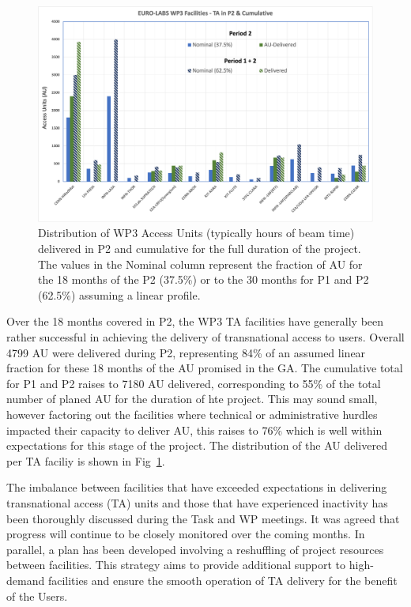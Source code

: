 \begin{figure}[!h]
    \centering
    \includegraphics[width=0.98\linewidth]{graphics/WP3-TAstatistics.png}
    \caption{Distribution of WP3 Access Units (typically hours of beam time) delivered in P2 and cumulative for the full duration of the project. The values in the Nominal column represent the fraction of AU for the 18 months of the P2 (37.5\%) or to the 30 months for P1 and P2 (62.5\%) assuming a linear profile.}
    \label{fig:wpe-taunits}
\end{figure}
Over the 18 months covered in P2, the WP3 TA facilities have generally been rather successful in achieving the delivery of transnational access to users. Overall 4799 AU were delivered during P2, representing 84\% of an assumed linear fraction for these 18 months of the AU promised in the GA. The cumulative total for P1 and P2 raises to 7180 AU delivered, corresponding to 55\% of the total number of planed AU for the duration of hte project. This may sound small, however factoring out the facilities where technical or administrative hurdles impacted their capacity to deliver AU, this raises to 76\% which is well within expectations for this stage of the project. The distribution of the AU delivered per TA faciliy is shown in Fig~\ref{fig:wpe-taunits}.

The imbalance between facilities that have exceeded expectations in delivering transnational access (TA) units and those that have experienced inactivity has been thoroughly discussed during the Task and WP meetings. It was agreed that progress will continue to be closely monitored over the coming months. In parallel, a plan has been developed involving a reshuffling of project resources between facilities. This strategy aims to provide additional support to high-demand facilities and ensure the smooth operation of TA delivery for the benefit of the Users.

